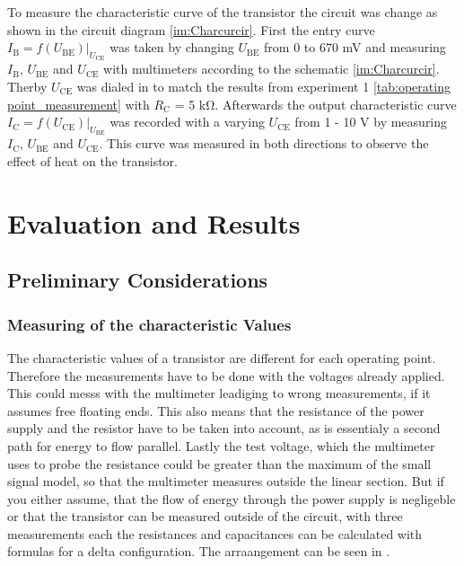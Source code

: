 \documentclass[11pt, a4paper]{article}
\begin{document}
To measure the characteristic curve of the transistor the circuit was change as shown in the circuit diagram \ref{im:Charcurcir}. 
First the entry curve $I_{\text{B}}=f(U_{\text{BE}})|_{U_{\text{CE}}}$ was taken by changing $U_{\text{BE}}$ from 0 to 670 \si{\milli\volt} and measuring $I_{\text{B}}$,
$U_{\text{BE}}$ and $U_{\text{CE}}$ with multimeters according to the schematic \ref{im:Charcurcir}. Therby $U_{\text{CE}}$ was dialed in to match the results from experiment 1 \ref{tab:operating point_measurement} with $R_{\text{C}}$ = 5 \si{\kilo\ohm}.
Afterwards the output characteristic curve $I_{\text{C}} = f(U_{\text{CE}})|_{U_{\text{BE}}}$ was recorded with a varying $U_{\text{CE}}$ from 1 - 10 \si{\volt} by measuring $I_{\text{C}}$, $U_{\text{BE}}$ and $U_{\text{CE}}$. This curve was measured in both directions to observe the effect of heat on the transistor.

\section{Evaluation and Results}
\FloatBarrier
\subsection{Preliminary Considerations}

\subsubsection{Measuring of the characteristic Values}
The characteristic values of a transistor are different for each operating point. Therefore the measurements have to be done with the voltages already applied. This could messs with the multimeter leadiging to wrong measurements, if it assumes free floating ends. This also means that the resistance of the power supply and the resistor have to be taken into account, as is essentialy a second path for energy to flow parallel. Lastly the test voltage, which the multimeter uses to probe the resistance could be greater than the maximum of the small signal model, so that the multimeter measures outside the linear section. But if you either assume, that the flow of energy through the power supply is negligeble or that the transistor can be measured outside of the circuit, with three measurements each the resistances and capacitances can be calculated with formulas for a delta configuration. The arraangement can be seen in \cite[figure 11]{TRA}.
\end{document}
